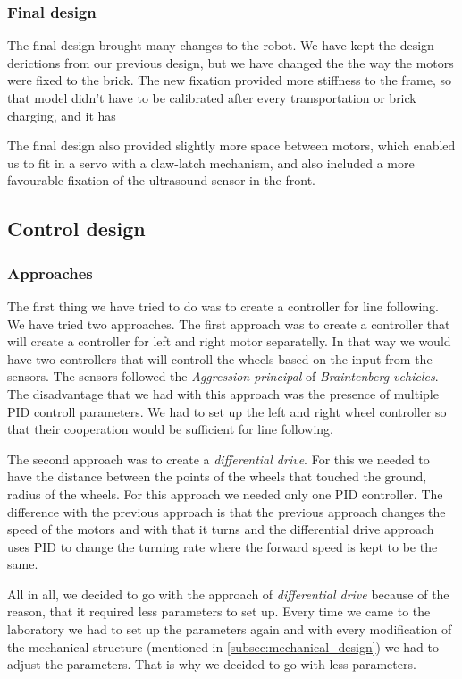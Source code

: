 \documentclass{article}
\begin{document}
\subsubsection{Final design}

The final design brought many changes to the robot. We have kept the design derictions from our previous design, but
we have changed the the way the motors were fixed to the brick. The new fixation provided more stiffness to the frame,
 so that model didn't have to be calibrated after every transportation or brick charging, and it has

The final design also provided slightly more space between motors, which enabled us to fit in a servo with a claw-latch
mechanism, and also included a more favourable fixation of the ultrasound sensor in the front.

\subsection{Control design}
\label{subsec:control_design}

\subsubsection{Approaches}
\label{subsubsec:approaches}

The first thing we have tried to do was to create a controller for line following. We have tried two approaches.
The first approach was to create a controller that will create a controller for left and right motor separatelly. In
that way we would have two controllers that will controll the wheels based on the input from the sensors. The sensors
followed the \textit{Aggression principal} of \textit{Braintenberg vehicles}. The disadvantage that we had with this
approach was the presence of multiple PID controll parameters. We had to set up the left and right wheel controller so
that their cooperation would be sufficient for line following.

The second approach was to create a \textit{differential drive}. For this we needed to have the distance between the
points of the wheels that touched the ground, radius of the wheels. For this approach we needed only one PID controller.
The difference with the previous approach is that the previous approach changes the speed of the motors and with that
it turns and the differential drive approach uses PID to change the turning rate where the forward speed is kept to be
the same.

All in all, we decided to go with the approach of \textit{differential drive} because of the reason, that it required
less parameters to set up. Every time we came to the laboratory we had to set up the parameters again and with every
modification of the mechanical structure (mentioned in \ref{subsec:mechanical_design}) we had to adjust the parameters.
That is why we decided to go with less parameters.
\end{document}
